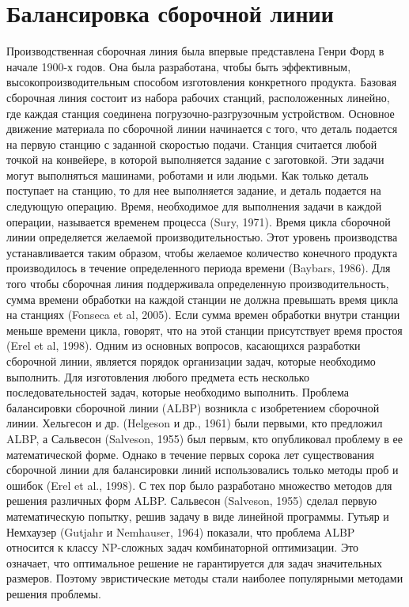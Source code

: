 \section{Балансировка сборочной линии}

Производственная сборочная линия была впервые представлена
Генри Форд в начале 1900-х годов. Она была разработана, чтобы быть эффективным,
высокопроизводительным способом изготовления конкретного продукта. Базовая сборочная
линия состоит из набора рабочих станций, расположенных линейно, где каждая станция соединена погрузочно-разгрузочным устройством.
Основное движение материала по сборочной линии начинается с того, что деталь подается на первую станцию с
заданной скоростью подачи. Станция считается любой точкой на конвейере, в которой 
выполняется задание с заготовкой. Эти задачи могут выполняться машинами, роботами и
или людьми. Как только деталь поступает на станцию, то для нее выполняется задание, 
и деталь подается на следующую операцию. Время, необходимое для выполнения задачи
в каждой операции, называется временем процесса (Sury, 1971). Время цикла сборочной 
линии определяется желаемой производительностью. Этот уровень производства 
устанавливается таким образом, чтобы желаемое количество конечного продукта 
производилось в течение определенного периода времени (Baybars, 1986). Для того чтобы 
сборочная линия поддерживала определенную производительность, сумма времени обработки
на каждой станции не должна превышать время цикла на станциях (Fonseca et al, 2005). 
Если сумма времен обработки внутри станции меньше времени цикла, говорят, что на этой
станции присутствует время простоя (Erel et al, 1998). Одним из основных вопросов,
касающихся разработки сборочной линии, является порядок организации задач, которые 
необходимо выполнить. Для изготовления любого предмета есть несколько 
последовательностей задач, которые необходимо выполнить. Проблема балансировки 
сборочной линии (ALBP) возникла с изобретением сборочной линии. Хельгесон и др. 
(Helgeson и др., 1961) были первыми, кто предложил ALBP, а Сальвесон (Salveson, 1955)
был первым, кто опубликовал проблему в ее математической форме. 
Однако в течение первых сорока лет существования сборочной линии для балансировки
линий использовались только методы проб и ошибок (Erel et al., 1998). С тех пор 
было разработано множество методов для решения различных форм ALBP. 
Сальвесон (Salveson, 1955) сделал первую математическую попытку, решив задачу в
виде линейной программы. Гутьяр и Немхаузер (Gutjahr и Nemhauser, 1964) показали,
что проблема ALBP относится к классу NP-сложных задач комбинаторной оптимизации.
Это означает, что оптимальное решение не гарантируется для задач значительных размеров. 
Поэтому эвристические методы стали наиболее популярными методами решения проблемы.


